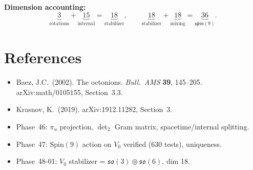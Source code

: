 \documentclass[11pt]{article}
\theoremstyle{definition}
\theoremstyle{remark}
\begin{document}
\bigskip
\noindent\textbf{Dimension accounting:}
\[
  \underbrace{3}_{\text{rotations}} + \underbrace{15}_{\text{internal}}
  = \underbrace{18}_{\text{stabilizer}},
  \qquad
  \underbrace{18}_{\text{stabilizer}} + \underbrace{18}_{\text{mixing}}
  = \underbrace{36}_{\mathfrak{spin}(9)}.
\]

\section*{References}

\begin{itemize}
  \item Baez, J.C.\ (2002).
    The octonions. \emph{Bull.\ AMS} \textbf{39}, 145--205.
    arXiv:math/0105155, Section~3.3.
  \item Krasnov, K.\ (2019).
    arXiv:1912.11282, Section~3.
  \item Phase~46: $\pi_u$ projection, $\det_2$ Gram matrix, spacetime/internal splitting.
  \item Phase~47: $\mathrm{Spin}(9)$ action on $V_0$ verified (630 tests), uniqueness.
  \item Phase~48-01: $V_0$ stabilizer = $\mathfrak{so}(3) \oplus \mathfrak{so}(6)$, dim 18.
\end{itemize}
\end{document}
